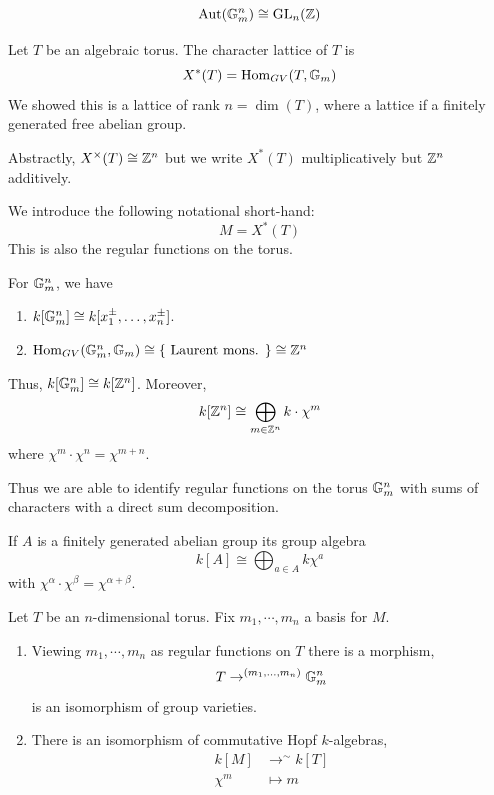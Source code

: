 \documentclass[12pt]{amsart}
\begin{document}
\begin{corollary}
    \[ \operatorname{Aut}(\mathbb G_m^n) \cong \operatorname{GL}_n(\mathbb Z)\]
\end{corollary}

\begin{definition}
    Let $T$ be an algebraic torus. The character lattice of $T$ is
    \[ X^*(T) = \operatorname{Hom}_{GV}(T, \mathbb G_m) \]
    We showed this is a lattice of rank $n = \dim(T)$, where a lattice if a finitely generated free abelian group.  
\end{definition}

Abstractly, $X^\times(T) \cong \mathbb Z^n$ but we write $X^*(T)$ multiplicatively but $\mathbb Z^n$ additively. 

\begin{definition}
    We introduce the following notational short-hand: 
    \[ M = X^*(T)\]
    This is also the regular functions on the torus.
\end{definition}


For $\mathbb G_m^n$, we have 
\begin{enumerate}
    \item $k[\mathbb G_m^n] \cong k[x_1^\pm, \ldots, x_n^\pm]$.
    \item $\operatorname{Hom}_{GV}(\mathbb G_m^n, \mathbb G_m) \cong \{ \text{ Laurent mons. }\} \cong \mathbb Z^n$
\end{enumerate}
Thus, $k[\mathbb G_m^n] \cong k[\mathbb Z^n]$. Moreover,
\[ k[\mathbb Z^n] \cong \bigoplus_{m \in \mathbb Z^n} k \cdot \chi^m \]
where $\chi^m \cdot \chi^n = \chi^{m+n}$. 

Thus we are able to identify regular functions on the torus $\mathbb G_m^n$ with sums of characters with a direct sum decomposition. 

\begin{definition}
    If $A$ is a finitely generated abelian group its group algebra 
    \[ k[A] \cong \bigoplus_{a \in A} k\chi^a \]
    with $\chi^\alpha \cdot \chi^\beta = \chi^{\alpha + \beta}$. 
\end{definition}

\begin{theorem}
    Let $T$ be an $n$-dimensional torus. Fix $m_1, \cdots, m_n$ a basis for $M$. 
    \begin{enumerate}
        \item Viewing $m_1, \cdots, m_n$ as regular functions on $T$ there is a morphism, 
        \[ T \to^{(m_1, \ldots, m_n)} \mathbb G_m^n\]
        is an isomorphism of group varieties. 
        \item There is an isomorphism of commutative Hopf $k$-algebras, 
        \begin{align*}
            k[M] &\to^\sim k[T] \\
            \chi^m &\mapsto m
        \end{align*}
    \end{enumerate}
\end{theorem}
\end{document}
